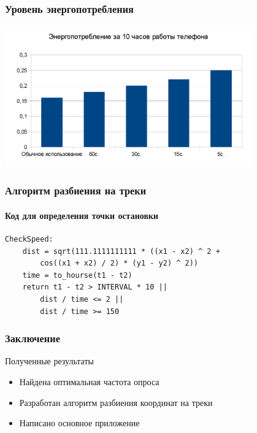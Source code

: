 \documentclass[hyperref={unicode}]{beamer}
\begin{document}
\begin{frame}
  \frametitle{Уровень энергопотребления}
	\begin{center}
		\includegraphics[width=0.8\textwidth]{images/Consuming.png}
	\end{center}
  
\end{frame}

\begin{frame}[fragile]
\frametitle{Алгоритм разбиения на треки}
\framesubtitle{Код для определения точки остановки}

\begin{lstlisting}
CheckSpeed:
	dist = sqrt(111.1111111111 * ((x1 - x2) ^ 2 + 
		cos((x1 + x2) / 2) * (y1 - y2) ^ 2))
	time = to_hourse(t1 - t2)
	return t1 - t2 > INTERVAL * 10 ||
		dist / time <= 2 ||
		dist / time >= 150
\end{lstlisting}

\end{frame}

\begin{frame}
  \frametitle{Заключение}
  
  Полученные результаты
  
  \begin{itemize}
  	\item Найдена оптимальная частота опроса
  	\item Разработан алгоритм разбиения координат на треки
  	\item Написано основное приложение
  \end{itemize}
  
\end{frame}
\end{document}
